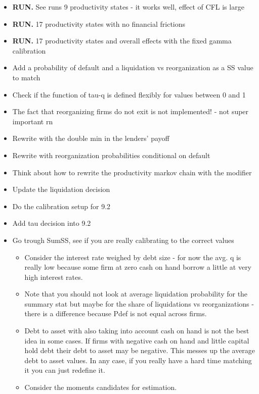 \documentclass[12pt]{article}
\begin{document}
\begin{itemize}
    \item \textbf{RUN.} See runs 9 productivity states - it works well, effect of CFL is large \checkmark
    \item \textbf{RUN.} 17 productivity states with no financial frictions \checkmark
    \item \textbf{RUN.} 17 productivity states and overall effects with the fixed gamma calibration \checkmark
    \item Add a probability of default and a liquidation vs reorganization as a SS value to match
    \item Check if the function of tau-q is defined flexibly for values between 0 and 1 \checkmark
    \item The fact that reorganizing firms do not exit is not implemented! - not super important rn \checkmark
    \item Rewrite with the double min in the lenders' payoff \checkmark
    \item Rewrite with reorganization probabilities conditional on default \checkmark
    \item Think about how to rewrite the productivity markov chain with the modifier   \checkmark
    \item Update the liquidation decision  \checkmark
    \item Do the calibration setup for 9.2 \checkmark
    \item Add tau decision into 9.2
    \item Go trough SumSS, see if you are really calibrating to the correct values 
    \begin{itemize}
        \item Consider the interest rate weighed by debt size - for now the avg. q is really low because some firm at zero cash on hand borrow a little at very high interest rates.
        \item Note that you should not look at average liquidation probability for the summary stat but maybe for the share of liquidations vs reorganizations - there is a difference because Pdef is not equal across firms.  \checkmark
        \item Debt to asset with also taking into account cash on hand is not the best idea in some cases. If firms with negative cash on hand and little capital hold debt their debt to asset may be negative. This messes up the average debt to asset values. In any case, if you really have a hard time matching it you can just redefine it.
        \item Consider the moments candidates for estimation.
    \end{itemize}
\end{itemize} \normalsize
\newpage
\end{document}
